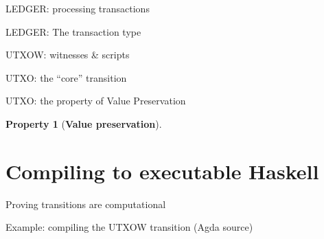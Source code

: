 \documentclass[aspectratio=169]{beamer}
\renewcommand\alert[1]{\textcolor{mLightBrown}{#1}}
\newtheorem{property}{Property}[section]
\begin{document}
\begin{frame}{LEDGER: processing transactions}
\scalebox{.9}{\vbox{%
\ledger
}}
\end{frame}

\begin{frame}{LEDGER: The transaction type}
\txType
\end{frame}

\begin{frame}{UTXOW: witnesses \& scripts}
\utxow
\end{frame}

\begin{frame}{UTXO: the ``core'' transition}
\utxo
\end{frame}

\begin{frame}{UTXO: the property of Value Preservation}
\begin{property}[\textbf{Value preservation}]
\pov
\end{property}
\end{frame}

\section{Compiling to executable Haskell}

\begin{frame}{Proving transitions are \alert{computational}}
\computational
\end{frame}

\begin{frame}{Example: \alert{compiling} the UTXOW transition (\alert{Agda} source)}
\scalebox{.8}{\vbox{%
\utxowComp
\vspace{.2cm}\hrule\vspace{.2cm}
\utxowStep
}}
\end{frame}
\end{document}
